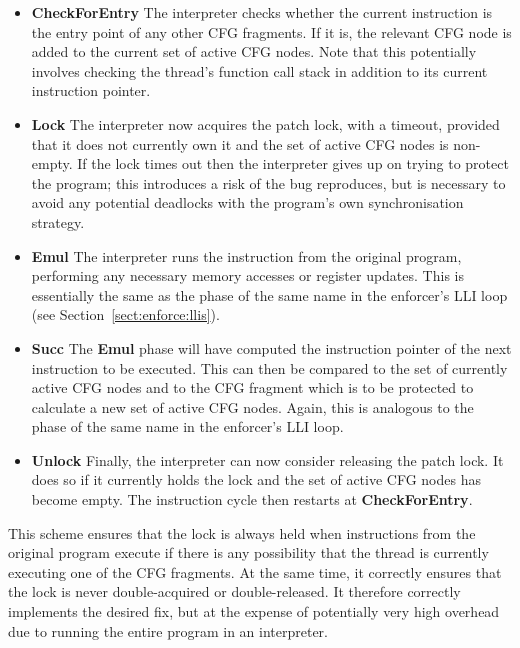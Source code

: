 \begin{itemize}
\item \textbf{CheckForEntry} The interpreter checks whether the
  current instruction is the entry point of any other CFG fragments.
  If it is, the relevant CFG node is added to the current set of
  active CFG nodes.  Note that this potentially involves checking the
  thread's function call stack in addition to its current instruction
  pointer.

\item \textbf{Lock} The interpreter now acquires the patch lock, with
  a timeout, provided that it does not currently own it and the set of
  active CFG nodes is non-empty.  If the lock times out then the
  interpreter gives up on trying to protect the program; this
  introduces a risk of the bug reproduces, but is necessary to avoid
  any potential deadlocks with the program's own synchronisation
  strategy.

\item \textbf{Emul} The interpreter runs the instruction from the
  original program, performing any necessary memory accesses or
  register updates.  This is essentially the same as the phase of the
  same name in the enforcer's LLI loop (see
  Section~\ref{sect:enforce:llis}).

\item \textbf{Succ} The \textbf{Emul} phase will have computed the
  instruction pointer of the next instruction to be executed.  This
  can then be compared to the set of currently active CFG nodes and to
  the CFG fragment which is to be protected to calculate a new set of
  active CFG nodes.  Again, this is analogous to the phase of the same
  name in the enforcer's LLI loop.

\item \textbf{Unlock} Finally, the interpreter can now consider
  releasing the patch lock.  It does so if it currently holds the lock
  and the set of active CFG nodes has become empty.  The instruction
  cycle then restarts at \textbf{CheckForEntry}.
\end{itemize}

This scheme ensures that the lock is always held when instructions
from the original program execute if there is any possibility that the
thread is currently executing one of the CFG fragments.  At the same
time, it correctly ensures that the lock is never double-acquired or
double-released.  It therefore correctly implements the desired fix,
but at the expense of potentially very high overhead due to running
the entire program in an interpreter.

